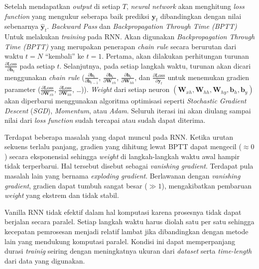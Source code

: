 Setelah mendapatkan \textit{output} di setiap $T$, \textit{neural network} akan menghitung \textit{loss function} yang mengukur seberapa baik prediksi $\mathbf{y}_t$  dibandingkan dengan nilai sebenarnya $\hat{\mathbf{y}}_t$. \textit{Backward Pass} dan \textit{Backpropagation Through Time (BPTT)} Untuk melakukan \textit{training} pada RNN. Akan digunakan \textit{Backpropagation Through Time (BPTT)} yang merupakan penerapan \textit{chain rule} secara berurutan dari waktu $t=N$ “kembali” ke $t=1$. Pertama, akan dilakukan perhitungan turunan $\frac{\partial \text{Loss}}{\partial \mathbf{h}_t}$ pada setiap $t$. Selanjutnya, pada setiap langkah waktu, turunan akan dicari menggunakan \textit{chain rule} ($\frac{\partial \mathbf{h}_t}{\partial \mathbf{h}_{t-1}}$, $\frac{\partial \mathbf{h}_t}{\partial \mathbf{W}_{xh}}$, $\frac{\partial \mathbf{h}_t}{\partial \mathbf{W}_{hh}}$, dan $\frac{\partial \text{Loss}}{\partial \mathbf{y}_t}$ untuk menemukan gradien parameter ($\frac{\partial \text{Loss}}{\partial \mathbf{W}_{xh}}$, $\frac{\partial \text{Loss}}{\partial \mathbf{W}_{hh}}$, \dots)). \textit{Weight} dari setiap neuron $(\mathbf{W}_{xh}, \mathbf{W}_{hh}, \mathbf{W}_{hy}, \mathbf{b}_h, \mathbf{b}_y)$ akan diperbarui menggunakan algoritma optimisasi seperti  \textit{Stochastic Gradient Descent} (\textit{SGD}), \textit{Momentum}, atau \textit{Adam}. Seluruh iterasi ini akan diulang sampai nilai dari \textit{loss function} sudah tercapai atau sudah dapat diterima. 


Terdapat beberapa masalah yang dapat muncul pada RNN. Ketika urutan sekuens terlalu panjang, gradien yang dihitung lewat BPTT dapat mengecil ($\approx 0$) secara eksponensial sehingga \textit{weight} di langkah-langkah waktu awal hampir tidak terperbarui. Hal tersebut disebut sebagai \textit{vanishing gradient}. Terdapat pula masalah lain yang bernama \textit{exploding gradient}. Berlawanan dengan \textit{vanishing gradient}, gradien dapat tumbuh sangat besar ($\gg 1$), mengakibatkan pembaruan \textit{weight} yang ekstrem dan tidak stabil.

Vanilla RNN tidak efektif dalam hal komputasi karena prosesnya tidak dapat berjalan secara paralel. Setiap langkah waktu harus diolah satu per satu sehingga kecepatan pemrosesan menjadi relatif lambat jika dibandingkan dengan metode lain yang mendukung komputasi paralel. Kondisi ini dapat memperpanjang durasi \textit{trainig} seiring dengan meningkatnya ukuran dari \textit{dataset} serta \textit{time-length} dari data yang digunakan.



